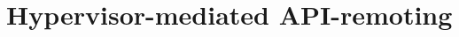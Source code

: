 \chapter{Hypervisor-mediated API-remoting}
\label{sec:ava}

\def\Model{\textsc{AvA}\xspace}
\def\model{\Model}
\def\Compiler{\textsc{C{AvA}}\xspace}
\def\compiler{\Compiler}
\def\Worker{API server\xspace}
\def\Workers{{\Worker}s\xspace}
\def\worker{\Worker}
\def\workers{{\worker}s\xspace}
\def\impl{\textsc{R{AvA}}\xspace}
\def\Impl{\impl}
\def\Vdev{Virtual transport device\xspace}
\def\vdev{virtual transport device\xspace}
\def\speclang{\textsc{Lapis}\xspace}
\def\Speclang{\speclang}
\def\noveltechnique{{{H}ypervisor {I}nterposed {R}emote {A}cceleration}\xspace}
\def\novtechabbrv{{HIRA}\xspace}

\def\numaccelerators{nine\xspace}
\def\numframeworks{eleven\xspace}











